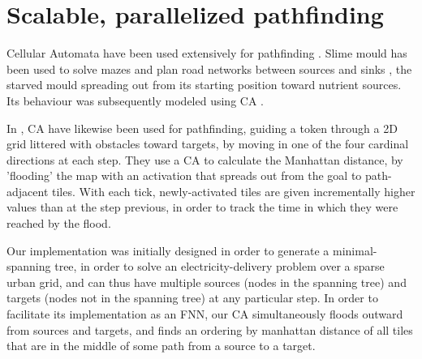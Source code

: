 \documentclass{article}
\begin{document}
\section{Scalable, parallelized pathfinding}



Cellular Automata have been used extensively for pathfinding \cite{singhal2014review, rosenstiehl1972intelligent}.
Slime mould has been used to solve mazes \cite{adamatzky2012slime} and plan road networks between sources and sinks \cite{adamatzky2010road}, the starved mould spreading out from its starting position toward nutrient sources. Its behaviour was subsequently modeled using CA \cite{tsompanas2016cellular}. %

In \cite{behring2001algorithm}, CA have likewise been used for pathfinding, guiding a token through a 2D grid littered with obstacles toward targets, by moving in one of the four cardinal directions at each step.
They use a CA to calculate the Manhattan distance, by 'flooding' the map with an activation that spreads out from the goal to path-adjacent tiles. 
With each tick, newly-activated tiles are given incrementally higher values than at the step previous, in order to track the time in which they were reached by the flood.

Our implementation was initially designed in order to generate a minimal-spanning tree, in order to solve an electricity-delivery problem over a sparse urban grid, and can thus have multiple sources (nodes in the spanning tree) and targets (nodes not in the spanning tree) at any particular step.
In order to facilitate its implementation as an FNN, our CA simultaneously floods outward from sources and targets, and finds an ordering by manhattan distance of all tiles that are in the middle of some path from a source to a target.







\end{document}
